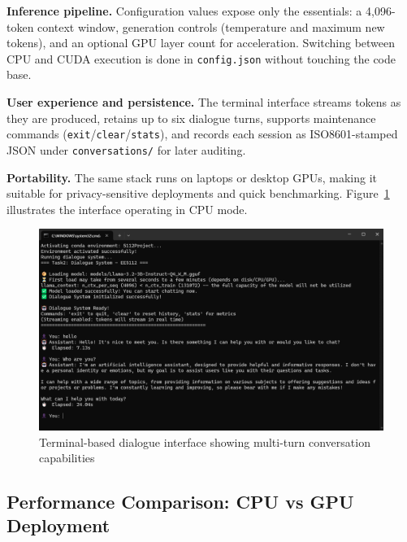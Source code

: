 \documentclass[12pt,a4paper]{article}
\begin{document}
\noindent\textbf{Inference pipeline.} Configuration values expose only the essentials: a 4,096-token context window, generation controls (temperature and maximum new tokens), and an optional GPU layer count for acceleration. Switching between CPU and CUDA execution is done in \texttt{config.json} without touching the code base.

\noindent\textbf{User experience and persistence.} The terminal interface streams tokens as they are produced, retains up to six dialogue turns, supports maintenance commands (\texttt{exit}/\texttt{clear}/\texttt{stats}), and records each session as ISO8601-stamped JSON under \texttt{conversations/} for later auditing.

\noindent\textbf{Portability.} The same stack runs on laptops or desktop GPUs, making it suitable for privacy-sensitive deployments and quick benchmarking. Figure~\ref{fig:llama_cpu_chat} illustrates the interface operating in CPU mode.

\begin{figure}[H]
    \centering
    \includegraphics[width=0.95\linewidth]{Figures/llama对话.png}
    \caption{Terminal-based dialogue interface showing multi-turn conversation capabilities}
    \label{fig:llama_cpu_chat}
\end{figure}





\subsection{Performance Comparison: CPU vs GPU Deployment}
\end{document}
